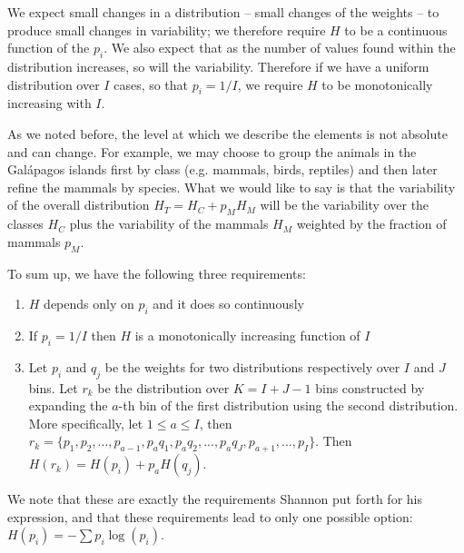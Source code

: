 \documentclass{article}
\begin{document}
We  expect small changes in a distribution -- small changes of the weights -- to produce small changes in variability; we therefore require $H$ to be a continuous function of the $p_i$. We also expect that as the number of values found within the distribution increases, so will the variability. Therefore if we have a uniform distribution over $I$ cases, so that $p_i = 1/I$, we require $H$ to be monotonically increasing with $I$.

As we noted before, the level at which we describe the elements is not absolute and can change. For example, we may choose to group the animals in the Gal\'{a}pagos islands first by class (e.g. mammals, birds, reptiles) and then later refine the mammals by species. What we would like to say is that the variability of the overall distribution $H_T = H_C + p_M H_M$ will be the variability over the classes $H_C$ plus the variability of the mammals $H_M$ weighted by the fraction of mammals $p_M$.

To sum up, we have the following three requirements:
\begin{enumerate}
\item $H$ depends only on $p_i$ and it does so continuously
\item If $p_i=1/I$ then $H$ is a monotonically increasing function of $I$
\item Let $p_i$ and $q_j$ be the weights for two distributions respectively over $I$ and $J$ bins. Let $r_k$ be the distribution over $K=I+J-1$ bins constructed by expanding the $a$-th bin of the first distribution using the second distribution. More specifically, let $1 \leq a \leq I$, then $r_k = \{p_1, p_2, ..., p_{a-1}, p_{a}q_1, p_{a}q_2, ..., p_{a}q_J, p_{a+1}, ..., p_I \}$. Then $H(r_k) = H(p_i) + p_{a} H(q_j)$.
\end{enumerate}

We note that these are exactly the requirements Shannon put forth for his expression\cite{Shannon}, and that these requirements lead to only one possible option: $H(p_i) = - \sum p_i \log(p_i)$.
\end{document}
